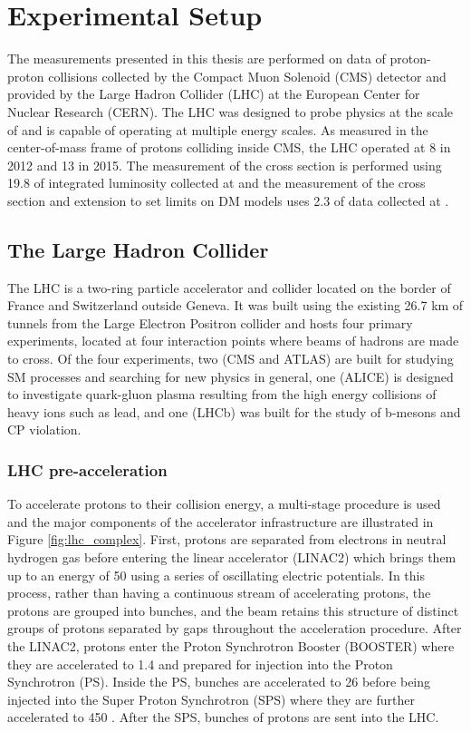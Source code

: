 
\chapter{Experimental Setup}\label{sec:experiment}

The measurements presented in this thesis are performed
 on data of proton-proton collisions collected %
 by the Compact Muon Solenoid (CMS) detector and
 provided by the
 Large Hadron Collider (LHC) at the 
 European Center for Nuclear Research (CERN).
The LHC was designed to probe physics at the 
 scale of \TeV and is capable of operating at
 multiple energy scales.
As measured in the center-of-mass frame
 of protons colliding inside CMS,
 the LHC operated at
 8 \TeV in 2012 and 13 \TeV in 2015.
The measurement of the \ppwbb cross section 
 is performed using 19.8 \fbinv of integrated luminosity
 collected at  \TeV and 
 the measurement of the \ppzgnng cross section
 and extension to set limits on DM models 
 uses 2.3 \fbinv of data collected at  \TeV. 

\section{The Large Hadron Collider}
The LHC is a two-ring particle accelerator and collider located 
 on the border of France and Switzerland outside Geneva.
It was built using the existing 26.7 km of tunnels from the
 Large Electron Positron collider and hosts
 four primary experiments, located at four
 interaction points where beams of hadrons are made to cross.
Of the four experiments, two (CMS and ATLAS) are built for 
 studying SM processes and searching for new physics in general,
 one (ALICE) is designed to investigate 
 quark-gluon plasma resulting from 
 the high energy collisions of heavy ions such as lead,
 and one (LHCb) was built for the study of
 b-mesons and CP violation.

\subsection{LHC pre-acceleration}
To accelerate protons to their collision energy,
 a multi-stage procedure is used and 
 the major components of the accelerator infrastructure
 are illustrated in Figure \ref{fig:lhc_complex}.
First, protons are separated from
 electrons in neutral hydrogen gas before
 entering the linear accelerator (LINAC2)
 which brings them up to an energy of 50 \MeV
 using a series of oscillating electric potentials.
In this process, rather than having a continuous 
 stream of accelerating protons, the protons
 are grouped into bunches, and the beam
 retains this structure
 of distinct groups of protons separated by gaps
 throughout the acceleration procedure.
After the LINAC2, protons enter the Proton
 Synchrotron Booster (BOOSTER) where
 they are accelerated to 1.4 \GeV and 
 prepared for injection into the Proton Synchrotron (PS).
Inside the PS, bunches are accelerated to
 26 \GeV before being injected into the
 Super Proton Synchrotron (SPS) where they 
 are further accelerated to 450 \GeV.
After the SPS, bunches of protons are sent into
 the LHC.

